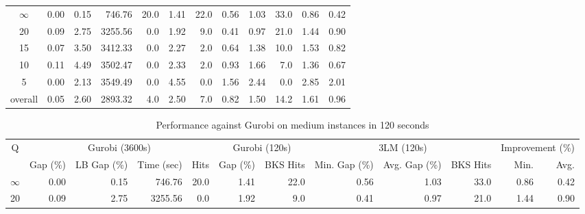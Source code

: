 \begin{table}[H]
\begin{tabular}{c rrrr rr rrr rr}
\cmidrule(lr){1-1} \cmidrule(lr){2-5} \cmidrule(lr){2-5} \cmidrule(lr){6-7} \cmidrule(lr){8-10} \cmidrule(lr){11-12}
$\infty$ &           0.00 &        0.15 &     746.76 & 20.0 &          1.41 &     22.0 &          0.56 &          1.03 &     33.0 &             0.86 & 0.42 \\
      20 &           0.09 &        2.75 &    3255.56 &  0.0 &          1.92 &      9.0 &          0.41 &          0.97 &     21.0 &             1.44 & 0.90 \\
      15 &           0.07 &        3.50 &    3412.33 &  0.0 &          2.27 &      2.0 &          0.64 &          1.38 &     10.0 &             1.53 & 0.82 \\
      10 &           0.11 &        4.49 &    3502.47 &  0.0 &          2.33 &      2.0 &          0.93 &          1.66 &      7.0 &             1.36 & 0.67 \\
       5 &           0.00 &        2.13 &    3549.49 &  0.0 &          4.55 &      0.0 &          1.56 &          2.44 &      0.0 &             2.85 & 2.01 \\
\midrule
 overall &           0.05 &        2.60 &    2893.32 &  4.0 &          2.50 &      7.0 &          0.82 &          1.50 &     14.2 &             1.61 & 0.96 \\
\bottomrule
\end{tabular}
\end{table}\begin{table}[H]
\centering
\caption{Performance against Gurobi on medium instances in 120 seconds}
\label{tab:3lm_resuts150T120}
\begin{tabular}{c rrrr rr rrr rr}
\toprule
       Q & \multicolumn{4}{c}{Gurobi (3600s)} & \multicolumn{2}{c}{Gurobi (120s)} & \multicolumn{3}{c}{3LM (120s)} & \multicolumn{2}{c}{Improvement (\%)} \\
         &       Gap (\%) & LB Gap (\%) & Time (sec) & Hits &      Gap (\%) & BKS Hits & Min. Gap (\%) & Avg. Gap (\%) & BKS Hits &             Min. & Avg. \\
\cmidrule(lr){1-1} \cmidrule(lr){2-5} \cmidrule(lr){2-5} \cmidrule(lr){6-7} \cmidrule(lr){8-10} \cmidrule(lr){11-12}
$\infty$ &           0.00 &        0.15 &     746.76 & 20.0 &          1.41 &     22.0 &          0.56 &          1.03 &     33.0 &             0.86 & 0.42 \\
      20 &           0.09 &        2.75 &    3255.56 &  0.0 &          1.92 &      9.0 &          0.41 &          0.97 &     21.0 &             1.44 & 0.90 \\

\end{tabular}
\end{table}

